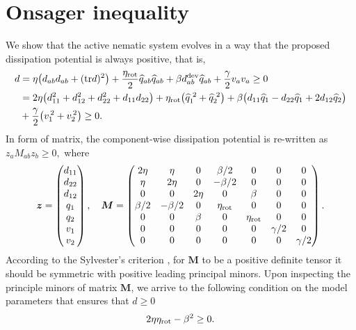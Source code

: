 	\section{Onsager inequality} \label{inequality}
We show that the active nematic system evolves in a way that the proposed dissipation potential is always positive, that is, 
\begin{align}
	d &  = \eta \big( d_{ab} d_{ab}   + (\text{tr}d)^2  \big) + \frac{\eta_{\text{rot}}}{2} \widehat{q}_{ab} \widehat{q}_{ab}  + \beta d_{ab}^{\rm dev}\widehat{q}_{ab} + \frac{\gamma}{2} v_a v_a \geq 0  \\ & = 
	2\eta \big( d_{11}^2 + d_{12}^2 + d_{22}^2  + d_{11}d_{22} \big) + \eta_{\text{rot}} \big( \widehat{q}_{1}^{\, \, 2} + \widehat{q}_{2}^{\, \, 2}  \big) + \beta \big(d_{11}\widehat{q}_{1} - d_{22}\widehat{q}_{1} + \nonumber  2d_{12}\widehat{q}_{2}\big)  \\ &  +  \nonumber  \frac{\gamma}{2} \big(v_1^{\,2} + v_2^{\,2}\big) \geq 0 \nonumber.
\end{align}
In form of matrix, the component-wise dissipation potential is re-written as $	z_{a} M_{ab} z_b\geq 0,$
where
\begin{align}
	\bm{z} = \begin{pmatrix}
		d_{11}\\ 
		d_{22}\\ 
		d_{12}\\ 
		q_{1}\\ 
		q_{2}\\ 
		v_1\\ 
		v_2\\ 
	\end{pmatrix}, \quad  \bm{M} = \begin{pmatrix}
		2\eta& \eta &0  &\beta/2  &0  &0  &0   \\ 
		\eta& 2\eta &0  &-\beta/2  &0  &0  &0   \\ 
		0&  0&  2\eta&  0& \beta &0  &0   \\ 
		\beta/2& -\beta/2 &0  &\eta_{\rm rot}  &0  &0  &0   \\ 
		0&  0 &\beta  & 0 & \eta_{\rm rot} &0  &0   \\ 
		0& 0 & 0 & 0 & 0 & \gamma/2 & 0  \\ 
		0& 0 & 0 & 0 & 0 & 0 & \gamma/2
	\end{pmatrix}.
\end{align}
According to the Sylvester's criterion \cite{doi:10.1080/00029890.1991.11995702}, for $\bm{M}$ to be a positive definite tensor it should be symmetric with positive leading principal minors. Upon inspecting the principle minors of matrix $\bm{M}$, we arrive to the following condition on the model parameters that ensures that $ d  \geq 0$
\begin{equation}
	2\eta \eta_{\rm rot} - \beta^2 \geq 0.
\end{equation}
